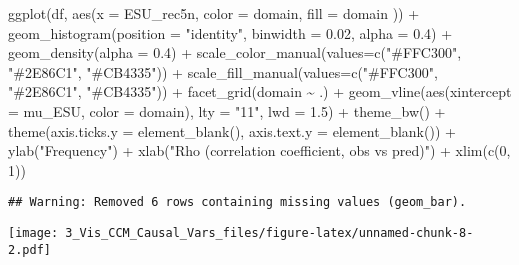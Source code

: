\documentclass[
]{article}
\newenvironment{Shaded}{\begin{snugshade}}{\end{snugshade}}
\newcommand{\AttributeTok}[1]{\textcolor[rgb]{0.77,0.63,0.00}{#1}}
\newcommand{\DecValTok}[1]{\textcolor[rgb]{0.00,0.00,0.81}{#1}}
\newcommand{\FloatTok}[1]{\textcolor[rgb]{0.00,0.00,0.81}{#1}}
\newcommand{\FunctionTok}[1]{\textcolor[rgb]{0.00,0.00,0.00}{#1}}
\newcommand{\NormalTok}[1]{#1}
\newcommand{\SpecialCharTok}[1]{\textcolor[rgb]{0.00,0.00,0.00}{#1}}
\newcommand{\StringTok}[1]{\textcolor[rgb]{0.31,0.60,0.02}{#1}}
\begin{document}
\begin{Shaded}
\begin{Highlighting}[]
\FunctionTok{ggplot}\NormalTok{(df, }\FunctionTok{aes}\NormalTok{(}\AttributeTok{x =}\NormalTok{ ESU\_rec5n, }\AttributeTok{color =}\NormalTok{ domain, }\AttributeTok{fill =}\NormalTok{ domain )) }\SpecialCharTok{+} 
  \FunctionTok{geom\_histogram}\NormalTok{(}\AttributeTok{position =} \StringTok{"identity"}\NormalTok{, }\AttributeTok{binwidth =} \FloatTok{0.02}\NormalTok{, }\AttributeTok{alpha =} \FloatTok{0.4}\NormalTok{) }\SpecialCharTok{+}
  \FunctionTok{geom\_density}\NormalTok{(}\AttributeTok{alpha =} \FloatTok{0.4}\NormalTok{) }\SpecialCharTok{+}
  \FunctionTok{scale\_color\_manual}\NormalTok{(}\AttributeTok{values=}\FunctionTok{c}\NormalTok{(}\StringTok{"\#FFC300"}\NormalTok{, }\StringTok{"\#2E86C1"}\NormalTok{, }\StringTok{"\#CB4335"}\NormalTok{)) }\SpecialCharTok{+}
  \FunctionTok{scale\_fill\_manual}\NormalTok{(}\AttributeTok{values=}\FunctionTok{c}\NormalTok{(}\StringTok{"\#FFC300"}\NormalTok{, }\StringTok{"\#2E86C1"}\NormalTok{, }\StringTok{"\#CB4335"}\NormalTok{)) }\SpecialCharTok{+}
  \FunctionTok{facet\_grid}\NormalTok{(domain }\SpecialCharTok{\textasciitilde{}}\NormalTok{ .) }\SpecialCharTok{+}
  \FunctionTok{geom\_vline}\NormalTok{(}\FunctionTok{aes}\NormalTok{(}\AttributeTok{xintercept =}\NormalTok{ mu\_ESU, }\AttributeTok{color =}\NormalTok{ domain),}
            \AttributeTok{lty =} \StringTok{"11"}\NormalTok{, }\AttributeTok{lwd =} \FloatTok{1.5}\NormalTok{) }\SpecialCharTok{+}
  \FunctionTok{theme\_bw}\NormalTok{() }\SpecialCharTok{+}
  \FunctionTok{theme}\NormalTok{(}\AttributeTok{axis.ticks.y =} \FunctionTok{element\_blank}\NormalTok{(),}
        \AttributeTok{axis.text.y =} \FunctionTok{element\_blank}\NormalTok{()) }\SpecialCharTok{+}
  \FunctionTok{ylab}\NormalTok{(}\StringTok{"Frequency"}\NormalTok{) }\SpecialCharTok{+} \FunctionTok{xlab}\NormalTok{(}\StringTok{"Rho (correlation coefficient, obs vs pred)"}\NormalTok{) }\SpecialCharTok{+}
  \FunctionTok{xlim}\NormalTok{(}\FunctionTok{c}\NormalTok{(}\DecValTok{0}\NormalTok{, }\DecValTok{1}\NormalTok{))}
\end{Highlighting}
\end{Shaded}

\begin{verbatim}
## Warning: Removed 6 rows containing missing values (geom_bar).
\end{verbatim}

\texttt{[image: 3\_Vis\_CCM\_Causal\_Vars\_files/figure-latex/unnamed-chunk-8-2.pdf]}
\end{document}
